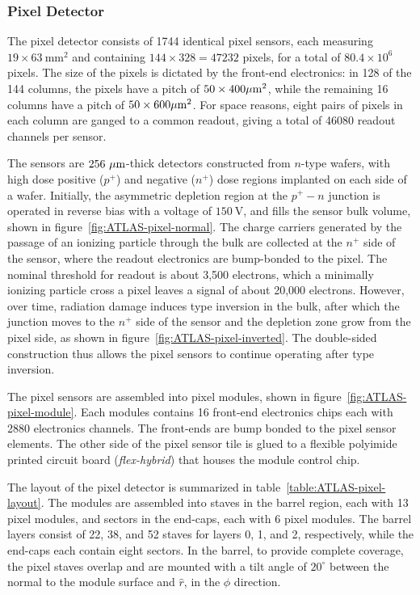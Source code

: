 \subsubsection{Pixel Detector}\label{sec:ATLAS-id-pixel-detector}

The pixel detector consists of 1744 identical pixel sensors, each measuring $19\times63~\mbox{mm}^2$ and containing $144\times 328=47232$ pixels, for a total of $80.4\times 10^6$ pixels. The size of the pixels is dictated by the front-end electronics: in 128 of the 144 columns, the pixels have a pitch of $50\times 400 \mu\mathrm{m}^2$, while the remaining 16 columns have a pitch of $50\times 600 \mu\mathrm{m}^2$. For space reasons, eight pairs of pixels in each column are ganged to a common readout, giving a total of 46080 readout channels per sensor.

 The sensors are $256~\mu\mathrm{m}$-thick detectors constructed from $n$-type wafers, with high dose positive ($p^+$) and negative ($n^+$) dose regions implanted on each side of a wafer. Initially, the asymmetric depletion region at the $p^+-n$ junction is operated in reverse bias with a voltage of $150~\mbox{V}$, and fills the sensor bulk volume, shown in figure~\ref{fig:ATLAS-pixel-normal}. The charge carriers generated by the passage of an ionizing particle through the bulk are collected at the $n^+$ side of the sensor, where the readout electronics are bump-bonded to the pixel. The nominal threshold for readout is about 3,500 electrons, which a minimally ionizing particle cross a pixel leaves a signal of about 20,000 electrons. However, over time, radiation damage induces type inversion in the bulk, after which the junction moves to the $n^+$ side of the sensor and the depletion zone grow from the pixel side, as shown in figure~\ref{fig:ATLAS-pixel-inverted}. The double-sided construction thus allows the pixel sensors to continue operating after type inversion.

The pixel sensors are assembled into pixel modules, shown in figure~\ref{fig:ATLAS-pixel-module}. Each modules contains 16 front-end electronics chips each with 2880 electronics channels. The front-ends are bump bonded to the pixel sensor elements. The other side of the pixel sensor tile is glued to a flexible polyimide printed circuit board (\emph{flex-hybrid}) that houses the module control chip.

The layout of the pixel detector is summarized in table~\ref{table:ATLAS-pixel-layout}.  The modules are assembled into staves in the barrel region, each with 13 pixel modules, and sectors in the end-caps, each with 6 pixel modules. The barrel layers consist of 22, 38, and 52 staves for layers 0, 1, and 2, respectively, while the end-caps each contain eight sectors. In the barrel, to provide complete coverage, the pixel staves overlap and are mounted with a tilt angle of $20^{\circ}$ between the normal to the module surface and $\hat{r}$, in the $\hat{\phi}$ direction. 

